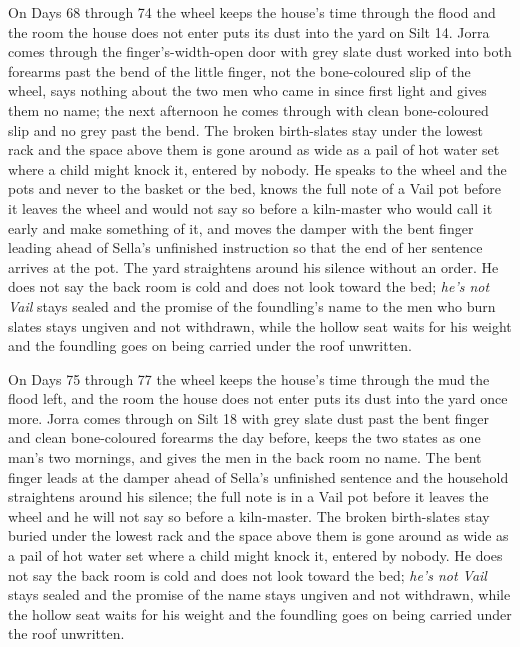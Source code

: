 \documentclass{design/chronicle}
\begin{document}
{On Days 68 through 74 the wheel keeps the house’s time through the flood and the room the house does not enter puts its dust into the yard on Silt 14. Jorra comes through the finger’s-width-open door with grey slate dust worked into both forearms past the bend of the little finger, not the bone-coloured slip of the wheel, says nothing about the two men who came in since first light and gives them no name; the next afternoon he comes through with clean bone-coloured slip and no grey past the bend. The broken birth-slates stay under the lowest rack and the space above them is gone around as wide as a pail of hot water set where a child might knock it, entered by nobody. He speaks to the wheel and the pots and never to the basket or the bed, knows the full note of a Vail pot before it leaves the wheel and would not say so before a kiln-master who would call it early and make something of it, and moves the damper with the bent finger leading ahead of Sella’s unfinished instruction so that the end of her sentence arrives at the pot. The yard straightens around his silence without an order. He does not say the back room is cold and does not look toward the bed; \emph{he’s not Vail} stays sealed and the promise of the foundling’s name to the men who burn slates stays ungiven and not withdrawn, while the hollow seat waits for his weight and the foundling goes on being carried under the roof unwritten.

On Days 75 through 77 the wheel keeps the house’s time through the mud the flood left, and the room the house does not enter puts its dust into the yard once more. Jorra comes through on Silt 18 with grey slate dust past the bent finger and clean bone-coloured forearms the day before, keeps the two states as one man’s two mornings, and gives the men in the back room no name. The bent finger leads at the damper ahead of Sella’s unfinished sentence and the household straightens around his silence; the full note is in a Vail pot before it leaves the wheel and he will not say so before a kiln-master. The broken birth-slates stay buried under the lowest rack and the space above them is gone around as wide as a pail of hot water set where a child might knock it, entered by nobody. He does not say the back room is cold and does not look toward the bed; \emph{he’s not Vail} stays sealed and the promise of the name stays ungiven and not withdrawn, while the hollow seat waits for his weight and the foundling goes on being carried under the roof unwritten.

}
\end{document}
